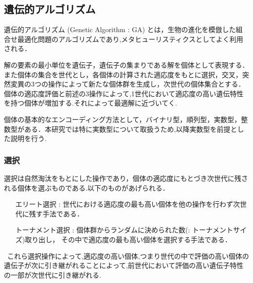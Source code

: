\subsection{遺伝的アルゴリズム}
  遺伝的アルゴリズム (Genetic Algorithm : GA)\cite{whitley1994genetic} とは，生物の進化を模倣した組合せ最適化問題のアルゴリズムであり,メタヒューリスティクスとしてよく利用される． 
  
  解の要素の最小単位を遺伝子，遺伝子の集まりである解を個体として表現する．また個体の集合を世代とし，各個体の計算された適応度をもとに選択，交叉，突然変異の3つの操作によって新たな個体群を生成し，次世代の個体集合とする．個体の適応度評価と前述の3操作によって,1世代において適応度の高い遺伝特性を持つ個体が増加する.それによって最適解に近づいてく.
  
  個体の基本的なエンコーディング方法として，バイナリ型，順列型，実数型，整数型がある．本研究では特に実数型について取扱うため,以降実数型を前提とした説明を行う.

\subsubsection{選択}
  選択\cite{blickle1996comparison}は自然淘汰をもとにした操作であり，個体の適応度にもとづき次世代に残される個体を選ぶものである.以下のものがあげられる．

\begin{itemize}
	\setlength{\leftskip}{25mm}
	\item[エリート選択\cite{murata1996multi} : ]世代における適応度の最も高い個体を他の操作を行わず次世代に残す手法である．

	\item[トーナメント選択 : ]個体群からランダムに決められた数(: トーナメントサイズ)取り出し，
	その中で適応度の最も高い個体を選択する手法である．
\end{itemize}


\ これら選択操作によって,適応度の高い個体,つまり世代の中で評価の高い個体の遺伝子が次に引き継がれることによって,前世代において評価の高い遺伝子特性の一部が次世代に引き継がれる.


